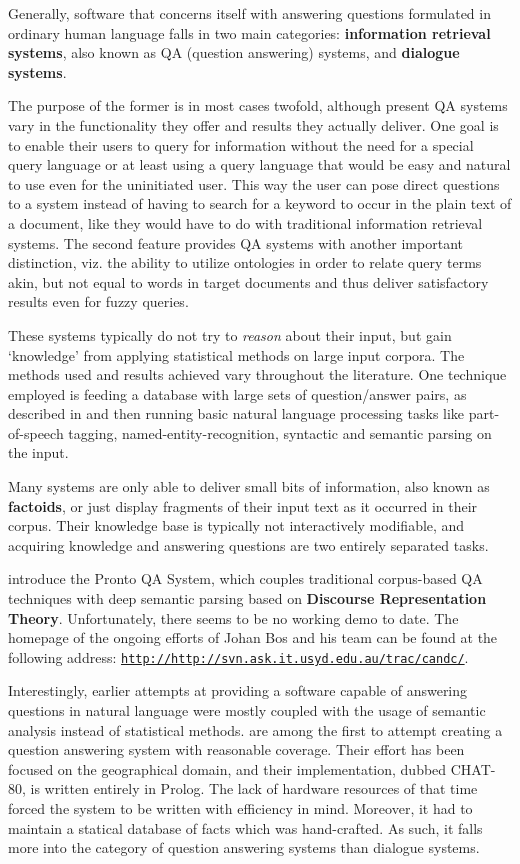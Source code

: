 \documentclass[a4paper]{article}
\newcommand{\abbr}{\textsf} %
\newcommand{\term}[1]{\textsf{\textbf{#1}}} %
\newcommand{\code}[1]{\texttt{#1}} %
\newcommand{\pn}{\textsf} %
\newcommand{\url}[1]{\code{http://#1}} %
\newcommand{\prol}{\pn{Prolog}}
\theoremstyle{remark}
\theoremstyle{remark}
\theoremstyle{definition}
\theoremstyle{definition}
\begin{document}
Generally, software that concerns itself with answering questions formulated in
ordinary human language falls in two main categories: \term{information
retrieval systems}, also known as \abbr{QA} (question answering) systems, and
\term{dialogue systems}.

The purpose of the former is in most cases twofold, although present
\abbr{QA} systems vary in the functionality they offer
and results they actually deliver. One goal is to enable their users to
query for information without the need for a special query language or at least
using a query language that would be easy and natural to use even for the
uninitiated user. This way the user can pose direct questions to a system
instead of having to search for a keyword to occur in the plain text of a
document, like they would have to do with traditional information
retrieval systems. The second feature provides \abbr{QA} systems with another important
distinction, viz. the ability to utilize ontologies in order to relate query
terms akin, but not equal to words in target documents and thus deliver
satisfactory results even for fuzzy queries.

These systems typically do not try to \emph{reason} about
their input, but gain `knowledge' from applying statistical methods on large
input corpora. The methods used and results achieved vary throughout the
literature. One technique employed is feeding a database with large sets of
question/answer pairs, as described in \cite{rama} and then running basic
natural language processing tasks like part-of-speech tagging,
named-entity-recognition, syntactic and semantic parsing on the input.

Many systems are only able to deliver small bits of information, also known as
\term{factoids}, or just display fragments of their input text as it occurred in
their corpus. Their knowledge base is typically not interactively modifiable,
and acquiring knowledge and answering questions are two entirely separated
tasks.

\cite{prontoqa} introduce the \pn{Pronto QA System}, which couples traditional
corpus-based \abbr{QA} techniques with deep semantic parsing based on
\term{Discourse Representation Theory}. Unfortunately, there seems
to be no working demo to date. The homepage of the ongoing efforts of Johan Bos
and his team can be found at the following address:
\href{http://svn.ask.it.usyd.edu.au/trac/candc/}{\url{http://svn.ask.it.usyd.edu.au/trac/candc/}}.

Interestingly, earlier attempts at providing a software capable of answering
questions in natural language were mostly coupled with the usage of
semantic analysis instead of statistical methods.
\cite{chat} are among  the first to attempt creating a question answering system
with reasonable coverage. Their effort has been focused on the geographical
domain, and their implementation, dubbed \pn{CHAT-80}, is written entirely in
\prol. The lack of hardware resources of that time forced the system to be
written with efficiency in mind. Moreover, it had to maintain a statical
database of facts which was hand-crafted. As such, it falls more into the
category of question answering systems than dialogue systems.
\end{document}
